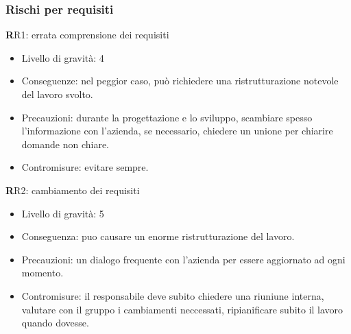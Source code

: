 \subsubsection{Rischi per requisiti}
\textbf RR1: errata comprensione dei requisiti
\begin{itemize}
\item Livello di gravità: 4
\item Conseguenze: nel peggior caso, può richiedere una ristrutturazione notevole del lavoro svolto.
\item Precauzioni: durante la progettazione e lo sviluppo, scambiare spesso l’informazione con l’azienda, se necessario, chiedere un unione per chiarire domande non chiare.
\item Contromisure: evitare sempre.
\end{itemize}
\textbf RR2:
cambiamento dei requisiti
\begin{itemize}
\item Livello di gravità: 5
\item Conseguenza: puo causare un enorme ristrutturazione del lavoro.
\item Precauzioni: un dialogo frequente con l'azienda per essere aggiornato ad ogni momento.
\item Contromisure: il responsabile deve subito chiedere una riuniune interna, valutare con il gruppo i cambiamenti neccessati, ripianificare subito il lavoro quando dovesse.
\end{itemize}



